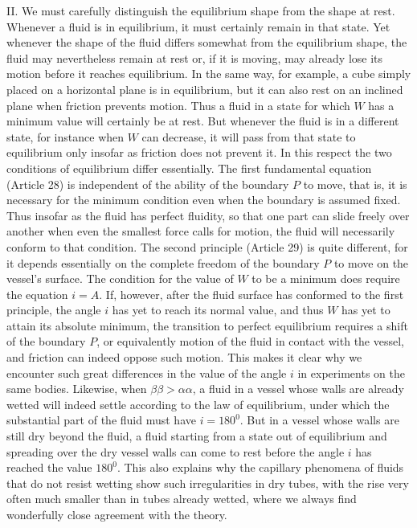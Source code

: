 II. We must carefully distinguish the equilibrium shape from the shape at rest. Whenever a fluid is in equilibrium, it must certainly remain in that state. Yet whenever the shape of the fluid differs somewhat from the equilibrium shape, the fluid may nevertheless remain at rest or, if it is moving, may already lose its motion before it reaches equilibrium. In the same way, for example, a cube simply placed on a horizontal plane is in equilibrium, but it can also rest on an inclined plane when friction prevents motion. Thus a fluid in a state for which $W$ has a minimum value will certainly be at rest. But whenever the fluid is in a different state, for instance when $W$ can decrease, it will pass from that state to equilibrium only insofar as friction does not prevent it. In this respect the two conditions of equilibrium differ essentially. The first fundamental equation (Article 28) is independent of the ability of the boundary $P$ to move, that is, it is necessary for the minimum condition even when the boundary is assumed fixed. Thus insofar as the fluid has perfect fluidity, so that one part can slide freely over another when even the smallest force calls for motion, the fluid will necessarily conform to that condition. The second principle (Article 29) is quite different, for it depends essentially on the complete freedom of the boundary $P$ to move on the vessel’s surface. The condition for the value of $W$ to be a minimum does require the equation $i=A$. If, however, after the fluid surface has conformed to the first principle, the angle $i$ has yet to reach its normal value, and thus $W$ has yet to attain its absolute minimum, the transition to perfect equilibrium requires a shift of the boundary $P$, or equivalently motion of the fluid in contact with the vessel, and friction can indeed oppose such motion. This makes it clear why we encounter such great differences in the value of the angle $i$ in experiments on the same bodies. Likewise, when $\beta\beta>\alpha\alpha$, a fluid in a vessel whose walls are already wetted will indeed settle according to the law of equilibrium, under which the substantial part of the fluid must have $i=180^0$. But in a vessel whose walls are still dry beyond the fluid, a fluid starting from a state out of equilibrium and spreading over the dry vessel walls can come to rest before the angle $i$ has reached the value $180^0$. This also explains why the capillary phenomena of fluids that do not resist wetting show such irregularities in dry tubes, with the rise very often much smaller than in tubes already wetted, where we always find wonderfully close agreement with the theory.

